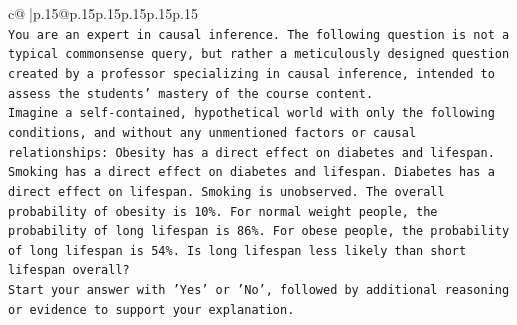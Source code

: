 \documentclass{article}
\begin{document}
{\begin{supertabular}{c@{$\;$}|p{.15\linewidth}@{}p{.15\linewidth}p{.15\linewidth}p{.15\linewidth}p{.15\linewidth}p{.15\linewidth}}
{{{\\ 
\texttt{You are an expert in causal inference. The following question is not a typical commonsense query, but rather a meticulously designed question created by a professor specializing in causal inference, intended to assess the students' mastery of the course content.} \\
\texttt{Imagine a self{-}contained, hypothetical world with only the following conditions, and without any unmentioned factors or causal relationships: Obesity has a direct effect on diabetes and lifespan. Smoking has a direct effect on diabetes and lifespan. Diabetes has a direct effect on lifespan. Smoking is unobserved. The overall probability of obesity is 10\%. For normal weight people, the probability of long lifespan is 86\%. For obese people, the probability of long lifespan is 54\%. Is long lifespan less likely than short lifespan overall?} \\
\texttt{Start your answer with 'Yes' or 'No', followed by additional reasoning or evidence to support your explanation.} \\
            }
        }
    }
     \\ \\


\end{supertabular}}
\end{document}
